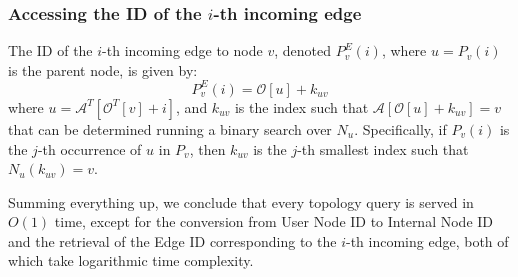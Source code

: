\subsubsection{Accessing the ID of the $i$-th incoming edge}
The ID of the $i$-th incoming edge to node $v$, denoted $P_v^E(i)$, where $u = P_v(i)$ is the parent node, is given by:
\begin{equation*}
    P_v^E(i) = \mathcal O[u] + k_{uv}
\end{equation*}
where $u = \mathcal A^{T}[\mathcal O^{T}[v] + i]$, and $k_{uv}$ is the index such that $\mathcal A[\mathcal O[u] + k_{uv}] = v$ that can be determined running a binary search over $N_u$. Specifically, if $P_v(i)$ is the $j$-th occurrence of $u$ in $P_v$, then $k_{uv}$ is the $j$-th smallest index such that $N_u(k_{uv}) = v$.

\bigskip

Summing everything up, we conclude that every topology query is served in \(O(1)\) time, except for the conversion from User Node ID to Internal Node ID and the retrieval of the Edge ID corresponding to the \(i\)-th incoming edge, both of which take logarithmic time complexity.